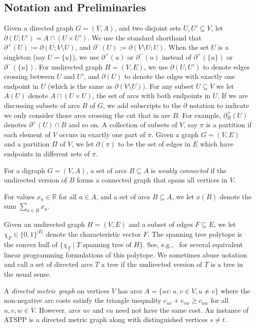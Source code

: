 \documentclass[11pt]{article}
\theoremstyle{definition}
\def\A{{B}}
\def\Re{{\mathbb R}}
\newcounter{note}[section]
\begin{document}
\subsection{Notation and Preliminaries}

Given a directed graph $G = (V,A)$, and two disjoint sets $U, U'
\subseteq V$, let $\partial(U;U') = A \cap (U \times U')$. We use the
standard shorthand that $\partial^+(U) := \partial(U; V \setminus U)$,
and $\partial^-(U) := \partial(V \setminus U; U)$. When the set $U$ is a
singleton (say $U = \{u\}$), we use $\partial^+(u)$ or $\partial^-(u)$
instead of $\partial^+(\{u\})$ or $\partial^-(\{u\})$. For undirected
graph $H = (V,E)$, we use $\partial(U; U')$ to denote edges crossing
between $U$ and $U'$, and $\partial(U)$ to denote the edges with exactly
one endpoint in $U$ (which is the same as $\partial(V \setminus U))$.
For any subset $U \subseteq V$ we let $A(U)$ denote $A \cap (U \times U)$, the set of
arcs with both endpoints in $U$.
If we are discussing subsets of arcs $\A$ of $G$, we add subscripts
to the $\partial$ notation to indicate we only consider those arcs crossing
the cut that in are $\A$.
For example, $\partial_{\A}^+(U)$ denotes $\partial^+(U) \cap  \A$
and so on. A collection of subsets of $V$, say $\pi$ is a partition if each element of $V$ occurs in exactly one part of $\pi$. Given a graph $G=(V,E)$ and a partition
$\Pi$ of $V$, we let $\partial(\pi)$ to be the set of edges in $E$ which have endpoints in different sets of $\pi$.

For a digraph $G = (V,A)$, a set of arcs $B \subseteq A$ is \emph{weakly
  connected} if the undirected version of $B$ forms a connected graph
that spans all vertices in $V$.

For values $x_a \in \Re$ for all $a \in A$, and a set of arcs $B
\subseteq A$, we let $x(B)$ denote the sum $\sum_{a \in B} x_a$.

Given an undirected graph $H = (V,E)$ and a subset of edges
$F \subseteq E$, we let $\chi_F \in \{0,1\}^{|E|}$ denote
the characteristic vector $F$. The spanning
tree polytope is the convex hull of $\{ \chi_T \mid T \text{ spanning
  tree of } H \}$. See, e.g.,~\cite[Chapter~50]{Schrijver-book} for
several equivalent linear programming formulations of this polytope.
We sometimes abuse notation and call a set of directed arcs $T$
a tree if the undirected version of $T$ is a tree in the usual sense.


A \emph{directed metric graph} on vertices $V$ has arcs $A = \{uv : u,v \in V, u \neq v\}$
where the non-negative arc costs satisfy the triangle
inequality $c_{uv} + c_{vw} \geq c_{uw}$ for all $u,v,w \in V$. However,
arcs $uv$ and $vu$ need not have the same cost. An instance of ATSPP
is a directed metric graph along with distinguished vertices $s
\neq t$.
\end{document}
